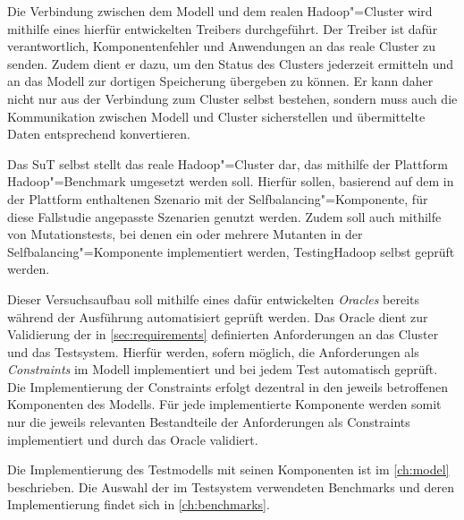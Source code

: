 Die Verbindung zwischen dem Modell und dem realen Hadoop"=Cluster wird mithilfe eines hierfür entwickelten Treibers durchgeführt.
Der Treiber ist dafür verantwortlich, Komponentenfehler und Anwendungen an das reale Cluster zu senden.
Zudem dient er dazu, um den Status des Clusters jederzeit ermitteln und an das Modell zur dortigen Speicherung übergeben zu können.
Er kann daher nicht nur aus der Verbindung zum Cluster selbst bestehen, sondern muss auch die Kommunikation zwischen Modell und Cluster sicherstellen und übermittelte Daten entsprechend konvertieren.

Das \gls{SuT} selbst stellt das reale Hadoop"=Cluster dar, das mithilfe der Plattform Hadoop"=Benchmark umgesetzt werden soll.
Hierfür sollen, basierend auf dem in der Plattform enthaltenen Szenario mit der Selfbalancing"=Komponente, für diese Fallstudie angepasste Szenarien genutzt werden.
Zudem soll auch mithilfe von Mutationstests, bei denen ein oder mehrere Mutanten in der Selfbalancing"=Komponente implementiert werden, TestingHadoop selbst geprüft werden.

Dieser Versuchsaufbau soll mithilfe eines dafür entwickelten \emph{Oracles} bereits während der Ausführung automatisiert geprüft werden.
Das Oracle dient zur Validierung der in \cref{sec:requirements} definierten Anforderungen an das Cluster und das Testsystem.
Hierfür werden, sofern möglich, die Anforderungen als \emph{Constraints} im Modell implementiert und bei jedem Test automatisch geprüft.
Die Implementierung der Constraints erfolgt dezentral in den jeweils betroffenen Komponenten des Modells.
Für jede implementierte Komponente werden somit nur die jeweils relevanten Bestandteile der Anforderungen als Constraints implementiert und durch das Oracle validiert.

Die Implementierung des Testmodells mit seinen Komponenten ist im \cref{ch:model} beschrieben.
Die Auswahl der im Testsystem verwendeten Benchmarks und deren Implementierung findet sich in \cref{ch:benchmarks}.
